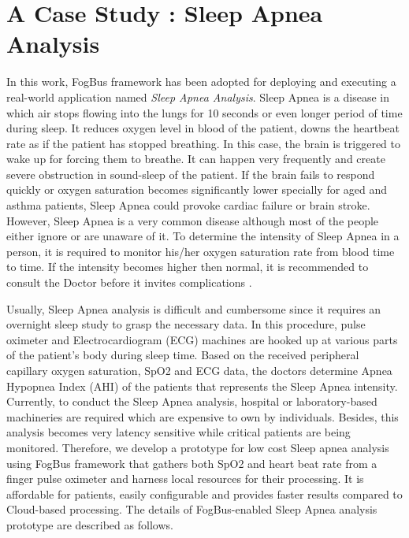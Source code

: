 \documentclass[final,5p,times,twocolumn]{elsarticle}
\begin{document}
\section{A Case Study : Sleep Apnea Analysis} \label{caseStudy}
In this work, FogBus framework has been adopted for deploying and executing a real-world application named \textit{Sleep Apnea Analysis}. Sleep Apnea is a disease in which air stops flowing into the lungs for 10 seconds or even longer period of time during sleep. It reduces oxygen level in blood of the patient, downs the heartbeat rate as if the patient has stopped breathing. In this case, the brain is triggered to wake up for forcing them to breathe. It can happen very frequently and create severe obstruction in sound-sleep of the patient. If the brain fails to respond quickly or oxygen saturation becomes significantly lower specially for aged and asthma patients, Sleep Apnea could provoke cardiac failure or brain stroke. However, Sleep Apnea is a very common disease although most of the people either ignore or are unaware of it. To determine the intensity of Sleep Apnea in a person, it is required to monitor his/her oxygen saturation rate from blood time to time. If the intensity becomes higher then normal, it is recommended to consult the Doctor before it invites complications \cite{sleep}.
%         
\par Usually, Sleep Apnea analysis is difficult and cumbersome since it requires an overnight sleep study to grasp the necessary data. In this procedure, pulse oximeter and Electrocardiogram (ECG) machines are hooked up at various parts of the patient's body during sleep time. Based on the received peripheral capillary oxygen saturation, SpO2 and ECG data, the doctors determine Apnea Hypopnea Index (AHI) of the patients that represents the Sleep Apnea intensity. Currently, to conduct the Sleep Apnea analysis, hospital or laboratory-based machineries are required which are expensive to own by individuals. Besides, this analysis becomes very latency sensitive while critical patients are being monitored. Therefore, we develop a prototype for low cost Sleep apnea analysis using FogBus framework that gathers both SpO2 and heart beat rate from a finger pulse oximeter and harness local resources for their processing. It is affordable for patients, easily configurable and provides faster results compared to Cloud-based processing. The details of FogBus-enabled Sleep Apnea analysis prototype are described as follows. 
%
\end{document}
